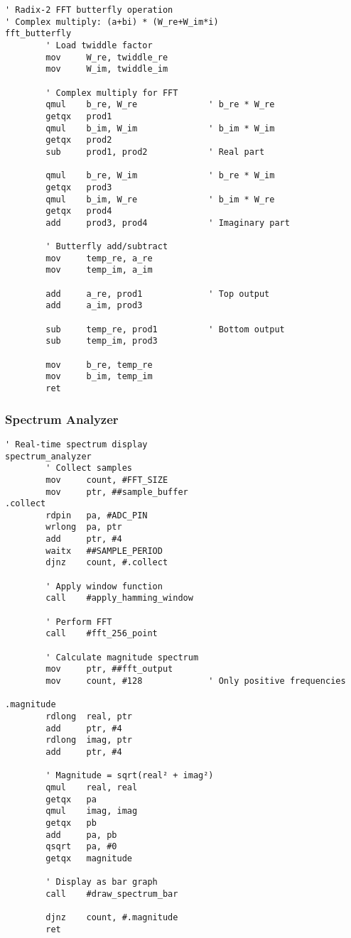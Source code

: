 \documentclass[11pt]{book}
\begin{document}
\begin{lstlisting}
' Radix-2 FFT butterfly operation
' Complex multiply: (a+bi) * (W_re+W_im*i)
fft_butterfly
        ' Load twiddle factor
        mov     W_re, twiddle_re
        mov     W_im, twiddle_im
        
        ' Complex multiply for FFT
        qmul    b_re, W_re              ' b_re * W_re
        getqx   prod1
        qmul    b_im, W_im              ' b_im * W_im
        getqx   prod2
        sub     prod1, prod2            ' Real part
        
        qmul    b_re, W_im              ' b_re * W_im
        getqx   prod3
        qmul    b_im, W_re              ' b_im * W_re
        getqx   prod4
        add     prod3, prod4            ' Imaginary part
        
        ' Butterfly add/subtract
        mov     temp_re, a_re
        mov     temp_im, a_im
        
        add     a_re, prod1             ' Top output
        add     a_im, prod3
        
        sub     temp_re, prod1          ' Bottom output
        sub     temp_im, prod3
        
        mov     b_re, temp_re
        mov     b_im, temp_im
        ret
\end{lstlisting}

\hypertarget{spectrum-analyzer}{%
\subsubsection{Spectrum Analyzer}\label{spectrum-analyzer}}

\begin{lstlisting}
' Real-time spectrum display
spectrum_analyzer
        ' Collect samples
        mov     count, #FFT_SIZE
        mov     ptr, ##sample_buffer
.collect
        rdpin   pa, #ADC_PIN
        wrlong  pa, ptr
        add     ptr, #4
        waitx   ##SAMPLE_PERIOD
        djnz    count, #.collect
        
        ' Apply window function
        call    #apply_hamming_window
        
        ' Perform FFT
        call    #fft_256_point
        
        ' Calculate magnitude spectrum
        mov     ptr, ##fft_output
        mov     count, #128             ' Only positive frequencies
        
.magnitude
        rdlong  real, ptr
        add     ptr, #4
        rdlong  imag, ptr
        add     ptr, #4
        
        ' Magnitude = sqrt(real² + imag²)
        qmul    real, real
        getqx   pa
        qmul    imag, imag
        getqx   pb
        add     pa, pb
        qsqrt   pa, #0
        getqx   magnitude
        
        ' Display as bar graph
        call    #draw_spectrum_bar
        
        djnz    count, #.magnitude
        ret
\end{lstlisting}
\end{document}
